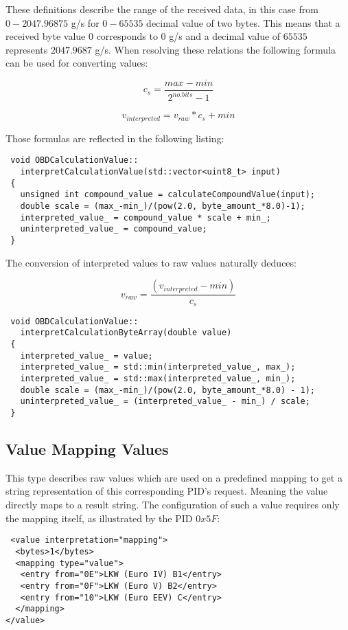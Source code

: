 These definitions describe the range of the received data, in this case from $0-2047.96875$ g/s for $0-65535$ decimal value of two bytes. 
This means that a received byte value $0$ corresponds to $0$ g/s and a decimal value of $65535$ represents $2047.9687$ g/s. When resolving these 
relations the following formula can be used for converting values: 

\[ c_s = \frac{max - min}{2^{no. bits} - 1} \]

\[ v_{interpreted} = v_{raw} * c_s + min \]

Those formulas are reflected in the following listing:

\begin{verbatim}
 void OBDCalculationValue::
   interpretCalculationValue(std::vector<uint8_t> input)
 {
   unsigned int compound_value = calculateCompoundValue(input);
   double scale = (max_-min_)/(pow(2.0, byte_amount_*8.0)-1);
   interpreted_value_ = compound_value * scale + min_;
   uninterpreted_value_ = compound_value;
 }
\end{verbatim}

The conversion of interpreted values to raw values naturally deduces:

\[ v_{raw} = \frac{(v_{interpreted} - min)}{c_s} \]

\begin{verbatim}
 void OBDCalculationValue::
   interpretCalculationByteArray(double value)
 {
   interpreted_value_ = value;
   interpreted_value_ = std::min(interpreted_value_, max_);
   interpreted_value_ = std::max(interpreted_value_, min_);
   double scale = (max_-min_)/(pow(2.0, byte_amount_*8.0) - 1);
   uninterpreted_value_ = (interpreted_value_ - min_) / scale;
 }
\end{verbatim}

\subsection{Value Mapping Values}

This type describes raw values which are used on a predefined mapping to get a string representation of this corresponding PID's request. Meaning the 
value directly maps to a result string. The configuration of such a value requires only the mapping itself, as illustrated by the PID $0x5F$:

\begin{verbatim}
 <value interpretation="mapping">
  <bytes>1</bytes>
  <mapping type="value">
   <entry from="0E">LKW (Euro IV) B1</entry>
   <entry from="0F">LKW (Euro V) B2</entry>
   <entry from="10">LKW (Euro EEV) C</entry>
  </mapping>        
</value>
\end{verbatim}

